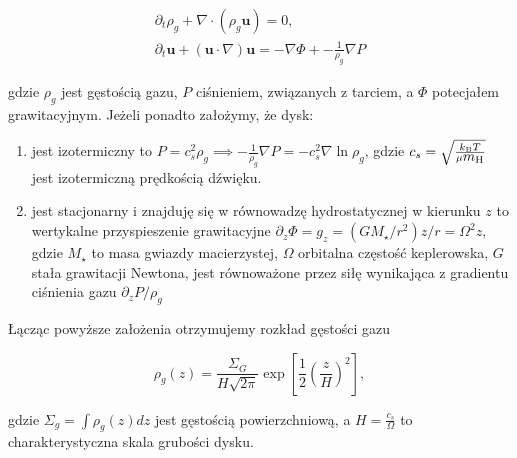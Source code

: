 \begin{gather}
   \partial_t \rho_g + \nabla\cdot\left(\rho_g\mathbf{u}\right) = 0,
   \label{eq:hd1}\\
\partial_t \mathbf{u} + \left(\mathbf{u}\cdot\nabla\right)\mathbf{u} = 
-\nabla\Phi + -\frac{1}{\rho_g} \nabla P \label{eq:hd2}
\end{gather}

gdzie $\rho_g$ jest gęstością gazu, $P$ ciśnieniem, 
związanych z tarciem, a $\Phi$ potecjałem grawitacyjnym. Jeżeli ponadto
założymy, że dysk:

\begin{enumerate}
   \item jest izotermiczny to $P = c_s^2 \rho_g \implies -\frac{1}{\rho_g}\nabla
      P = -c_s^2\nabla\ln\rho_g$, gdzie $c_s = \sqrt{\frac{k_{\textrm{B}} T}{\mu
    \hbox{$m_{\textrm{H}}$}}}$ jest izotermiczną prędkością dźwięku.
   \item jest stacjonarny i znajduję się w równowadzę hydrostatycznej w kierunku
      $z$ to wertykalne przyspieszenie grawitacyjne $\partial_z \Phi = g_z =
      (GM_\star/r^2) z/r = \Omega^2 z$, gdzie $M_\star$ to masa gwiazdy
      macierzystej, $\Omega$ orbitalna częstość keplerowska, $G$ stała
      grawitacji Newtona, jest równoważone przez siłę wynikająca z gradientu
      ciśnienia gazu $\partial_z P / \rho_g$
\end{enumerate}

Łącząc powyższe założenia otrzymujemy rozkład gęstości gazu

\begin{equation} \label{eq:zeq}
   \rho_g(z) = \frac{\Sigma_G}{H\sqrt{2\pi}} \exp \left[
   \frac{1}{2}\left(\frac{z}{H}\right)^2 \right],
\end{equation}

gdzie $\Sigma_g = \int \rho_g(z) dz$ jest gęstością powierzchniową, a
$H=\frac{c_s}{\Omega}$ to charakterystyczna skala grubości dysku.

